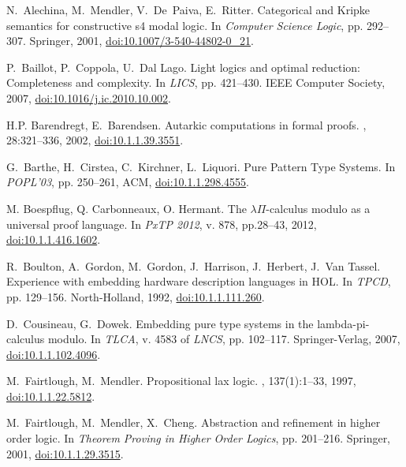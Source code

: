 \documentclass[submission,copyright,creativecommons]{eptcs}
\theoremstyle{plain}
\theoremstyle{definition}
\begin{document}
{
\begin{thebibliography}{10}
\begin{scriptsize}

 N.~Alechina, M.~Mendler, V.~De~Paiva,
  E.~Ritter.  \newblock Categorical and {K}ripke semantics for
  constructive s4 modal logic.  \newblock In {\em Computer Science
    Logic}, pp. 292--307. Springer, 2001,
  \url{doi:10.1007/3-540-44802-0\_21}.

 P.~Baillot, P.~Coppola, U.~Dal
  Lago.  \newblock Light logics and optimal reduction: Completeness
  and complexity.  \newblock In {\em LICS}, pp. 421--430. IEEE
  Computer Society, 2007, \url{doi:10.1016/j.ic.2010.10.002}.

 H.P. Barendregt, E.~Barendsen.  \newblock Autarkic
  computations in formal proofs.  , 28:321--336, 2002, \url{doi:10.1.1.39.3551}.

 G.~Barthe, H.~Cirstea, C.~Kirchner, L.~Liquori.
  \newblock Pure {P}attern {T}ype {S}ystems.  \newblock In {\em
    POPL'03}, pp. 250--261, ACM, \url{doi:10.1.1.298.4555}.

 M. Boespflug, Q. Carbonneaux, O. Hermant.  \newblock
  The $\lambda$$\Pi$-calculus
  modulo as a universal proof language.  \newblock In {\em PxTP 2012},
  v. {878}, pp.28--43, {2012}, \url{doi:10.1.1.416.1602}.

 R.~Boulton, A.~Gordon, M.~Gordon, J.~Harrison,
  J.~Herbert, J.~Van Tassel.  \newblock Experience with embedding
  hardware description languages in {HOL}.  \newblock In {\em TPCD},
  pp. 129--156.  North-Holland, 1992, \url{doi:10.1.1.111.260}.

 D.~Cousineau, G.~Dowek.  \newblock Embedding pure
  type systems in the lambda-pi-calculus modulo.  \newblock In {\em
    TLCA}, v. 4583 of {\em LNCS}, pp. 102--117. Springer-Verlag, 2007,
  \url{doi:10.1.1.102.4096}.

 M.~Fairtlough, M.~Mendler.
  \newblock Propositional lax logic.  , 137(1):1--33, 1997, \url{doi:10.1.1.22.5812}.

 M.~Fairtlough, M.~Mendler,
  X.~Cheng.  \newblock Abstraction and refinement in higher order
  logic.  \newblock In {\em Theorem Proving in Higher Order Logics},
  pp. 201--216.  Springer, 2001, \url{doi:10.1.1.29.3515}.


\end{scriptsize}
\end{thebibliography}}
\end{document}
